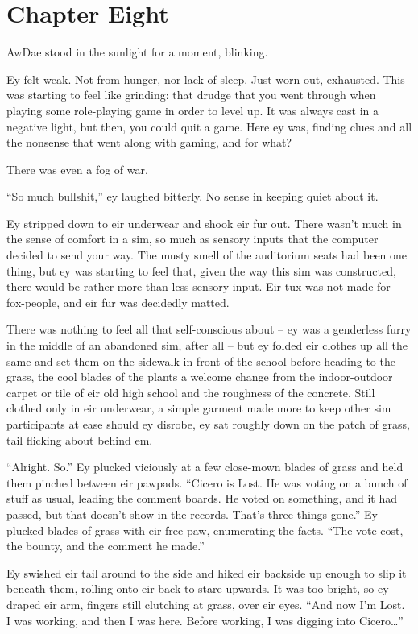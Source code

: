 \chapter*{Chapter Eight}

AwDae stood in the sunlight for a moment, blinking.

Ey felt weak. Not from hunger, nor lack of sleep. Just worn out, exhausted. This was starting to feel like grinding: that drudge that you went through when playing some role-playing game in order to level up. It was always cast in a negative light, but then, you could quit a game. Here ey was, finding clues and all the nonsense that went along with gaming, and for what?

There was even a fog of war.

``So much bullshit,'' ey laughed bitterly. No sense in keeping quiet about it.

Ey stripped down to eir underwear and shook eir fur out. There wasn't much in the sense of comfort in a sim, so much as sensory inputs that the computer decided to send your way. The musty smell of the auditorium seats had been one thing, but ey was starting to feel that, given the way this sim was constructed, there would be rather more than less sensory input. Eir tux was not made for fox-people, and eir fur was decidedly matted.

There was nothing to feel all that self-conscious about -- ey was a genderless furry in the middle of an abandoned sim, after all -- but ey folded eir clothes up all the same and set them on the sidewalk in front of the school before heading to the grass, the cool blades of the plants a welcome change from the indoor-outdoor carpet or tile of eir old high school and the roughness of the concrete. Still clothed only in eir underwear, a simple garment made more to keep other sim participants at ease should ey disrobe, ey sat roughly down on the patch of grass, tail flicking about behind em.

``Alright. So.'' Ey plucked viciously at a few close-mown blades of grass and held them pinched between eir pawpads. ``Cicero is Lost. He was voting on a bunch of stuff as usual, leading the comment boards. He voted on something, and it had passed, but that doesn't show in the records. That's three things gone.'' Ey plucked blades of grass with eir free paw, enumerating the facts. ``The vote cost, the bounty, and the comment he made.''

Ey swished eir tail around to the side and hiked eir backside up enough to slip it beneath them, rolling onto eir back to stare upwards. It was too bright, so ey draped eir arm, fingers still clutching at grass, over eir eyes. ``And now I'm Lost. I was working, and then I was here. Before working, I was digging into Cicero\ldots{}''

